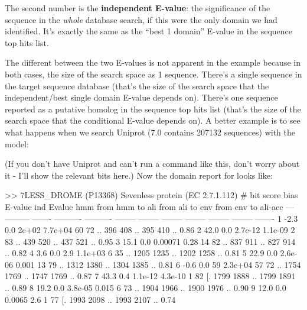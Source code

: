 The second number is the \textbf{independent E-value}: the
significance of the sequence in the \emph{whole} database search, if
this were the only domain we had identified. It's exactly the same as
the ``best 1 domain'' E-value in the sequence top hits list.

The different between the two E-values is not apparent in the
 example because in both cases, the size of the
search space as 1 sequence. There's a single sequence in the target
sequence database (that's the size of the search space that the
independent/best single domain E-value depends on). There's one
sequence reported as a putative homolog in the sequence top hits list
(that's the size of the search space that the conditional E-value
depends on). A better example is to see what happens when we search
Uniprot (7.0 contains 207132 sequences) with the  model:


(If you don't have Uniprot and can't run a command like this, don't
worry about it - I'll show the relevant bits here.) Now the domain
report for  looks like:

\begin{sreoutput}
>> 7LESS_DROME  (P13368) Sevenless protein (EC 2.7.1.112)
     # bit score    bias    E-value ind Evalue hmm from   hmm to    ali from   ali to    env from   env to    ali-acc
   --- --------- ------- ---------- ---------- -------- --------    -------- --------    -------- --------    -------
     1      -2.3     0.0      2e+02    7.7e+04       60       72 ..      396      408 ..      395      410 ..    0.86
     2      42.0     0.0    2.7e-12    1.1e-09        2       83 ..      439      520 ..      437      521 ..    0.95
     3      15.1     0.0    0.00071       0.28       14       82 ..      837      911 ..      827      914 ..    0.82
     4       3.6     0.0        2.9    1.1e+03        6       35 ..     1205     1235 ..     1202     1258 ..    0.81
     5      22.9     0.0    2.6e-06      0.001       13       79 ..     1312     1380 ..     1304     1385 ..    0.81
     6      -0.6     0.0         59    2.3e+04       57       72 ..     1754     1769 ..     1747     1769 ..    0.87
     7      43.3     0.4    1.1e-12    4.3e-10        1       82 [.     1799     1888 ..     1799     1891 ..    0.89
     8      19.2     0.0    3.8e-05      0.015        6       73 ..     1904     1966 ..     1900     1976 ..    0.90
     9      12.0     0.0     0.0065        2.6        1       77 [.     1993     2098 ..     1993     2107 ..    0.74
\end{sreoutput}

